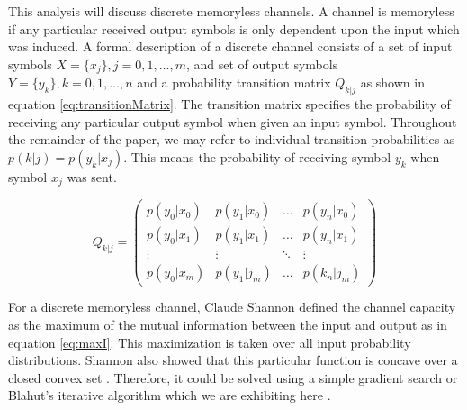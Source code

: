 \documentclass[journal]{IEEEtran}
\begin{document}
\par This analysis will discuss discrete memoryless channels. A channel is memoryless if any particular received output symbols is only dependent upon the input which was induced. A formal description of a discrete channel consists of a set of input symbols \begin{math}X = \{x_j\}, j = {0, 1,\dots, m}\end{math}, and set of output symbols \begin{math}Y = \{y_k\}, k = {0, 1,\dots, n}\end{math} and a probability transition matrix \begin{math}Q_{k|j}\end{math} as shown in equation \ref{eq:transitionMatrix}. The transition matrix specifies the probability of receiving any particular output symbol when given an input symbol. Throughout the remainder of the paper, we may refer to individual transition probabilities as \begin{math}p(k|j) = p(y_k|x_j)\end{math}. This means the probability of receiving symbol \begin{math}y_k\end{math} when symbol \begin{math}x_j\end{math} was sent.

\begin{equation}
\label{eq:transitionMatrix}
Q_{k|j} = \begin{pmatrix}
p(y_0|x_0) & p(y_1|x_0) & \dots & p(y_n|x_0) \\
p(y_0|x_1) & p(y_1|x_1) & \dots & p(y_n|x_1) \\
\vdots & \vdots &  \ddots & \vdots \\
p(y_0|x_m) & p(y_1|j_m) & \dots & p(k_n|j_m) \end{pmatrix}
\end{equation}

\par For a discrete memoryless channel, Claude Shannon defined the channel capacity as the maximum of the mutual information between the input and output as in equation \ref{eq:maxI}. This maximization is taken over all input probability distributions. Shannon also showed that this particular function is concave over a closed convex set \cite{shannon}. Therefore, it could be solved using a simple gradient search or Blahut's iterative algorithm which we are exhibiting here \cite[p.~191]{cover}.
\end{document}
